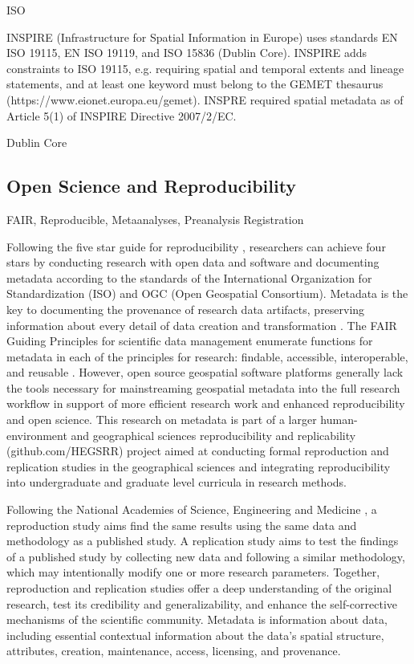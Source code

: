 \documentclass{isprs} %
\begin{document}
ISO

INSPIRE (Infrastructure for Spatial Information in Europe) uses standards EN ISO 19115, EN ISO 19119, and ISO 15836 (Dublin
Core). INSPIRE adds constraints to ISO 19115, e.g. requiring spatial and temporal extents and lineage statements, and at least one keyword must belong to the GEMET thesaurus (https://www.eionet.europa.eu/gemet). INSPRE required spatial metadata as of Article 5(1) of INSPIRE Directive 2007/2/EC.

Dublin Core

\subsection{Open Science and Reproducibility}\label{sec:Metadata}

FAIR, Reproducible, Metaanalyses, Preanalysis Registration

Following the five star guide for reproducibility \citep{Wilson2021}, researchers can achieve four stars by conducting research with open data and software and documenting metadata according to the standards of the International Organization for Standardization (ISO) and OGC (Open Geospatial Consortium).
Metadata is the key to documenting the provenance of research data artifacts, preserving information about every detail of data creation and transformation \citep{Tullis2021}. The FAIR Guiding Principles for scientific data management enumerate functions for metadata in each of the principles for research: findable, accessible, interoperable, and reusable \citep{Wilkinson2016}.
However, open source geospatial software platforms generally lack the tools necessary for mainstreaming geospatial metadata into the full research workflow in support of more efficient research work and enhanced reproducibility and open science.
This research on metadata is part of a larger human-environment and geographical sciences reproducibility and replicability (github.com/HEGSRR) project aimed at conducting formal reproduction and replication studies in the geographical sciences and integrating reproducibility into undergraduate and graduate level curricula in research methods.

Following the National Academies of Science, Engineering and Medicine \citep{NASEM2019}, a reproduction study aims find the same results using the same data and methodology as a published study.
A replication study aims to test the findings of a published study by collecting new data and following a similar methodology, which may intentionally modify one or more research parameters.
Together, reproduction and replication studies offer a deep understanding of the original research, test its credibility and generalizability, and enhance the self-corrective mechanisms of the scientific community.
Metadata is information about data, including essential contextual information about the data's spatial structure, attributes, creation, maintenance, access, licensing, and provenance.
\end{document}
